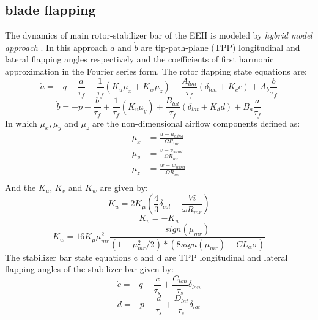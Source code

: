 \subsection{blade flapping}
The dynamics of main rotor-stabilizer bar of the EEH is modeled by \textit{hybrid model approach} \cite{mettler2002system}. In this approach $\dot{a}$ and $\dot{b}$ are  tip-path-plane (TPP) longitudinal and lateral flapping angles respectively and the coefficients of first harmonic approximation in the Fourier series form. The rotor flapping state equations are:
\begin{equation}
	\dot{a}=-q-\frac{a}{\tau_{f}}+\frac{1}{\tau_{f}}(K_u\mu_x+K_w\mu_z)+\frac{A_{lon}}{\tau_{f}} (\delta_{lon}+K_c c)+A_b\frac{b}{\tau_{f}}
\end{equation}
\begin{equation}
	\dot{b} = -p-\frac{b}{\tau_{f}}+\frac{1}{\tau_{f}}(K_v\mu_y)+\frac{B_{lat}}{\tau_{f}}(\delta_{lat}+K_d d)+B_a \frac{a}{\tau_{f}}
\end{equation}
In which $\mu_x,\mu_y$ and $\mu_z $ are the non-dimensional airflow components defined as:
\begin{equation}
	\begin{aligned}
		\mu_x&=\frac{u-u_{wind}}{\Omega R_{mr}}\\
		\mu_y&=\frac{v-v_{wind}}{\Omega R_{mr}} \\
		\mu_z&= \frac{w-w_{wind}}{\Omega R_{mr}}\\
	\end{aligned}
\end{equation}
And the $K_{u}$, $K_v$ and $K_w$ are given by:
\begin{equation}
	K_{u}=2K_{\mu}(\frac{4}{3}\delta_{col}-\frac{Vi}{\omega R_{mr}})
\end{equation}
\begin{equation}
	K_v=-K_u
\end{equation}
\begin{equation}
	K_w=16K_{\mu} \mu_{mr}^2 \frac{sign(\mu_{mr})}{(1-\mu_{mr}^2/2)*(8sign(\mu_{mr})+CL_\alpha \sigma)}
\end{equation}
The stabilizer bar state equations c and d are TPP longitudinal and lateral flapping angles of the stabilizer bar given by:
\begin{equation}
	\dot{c}=-q-\frac{c}{\tau_s}+\frac{C_{lon}}{\tau_s}\delta_{lon}
\end{equation}
\begin{equation}
	\dot{d}=-p-\frac{d}{\tau_s}+\frac{D_{lat}}{\tau_s}\delta_{lat}
\end{equation} 
